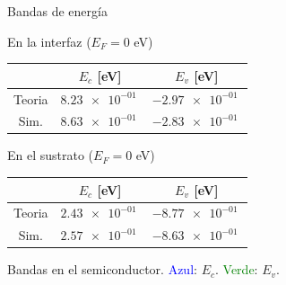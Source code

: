 \documentclass{/home/daniel/GitHub/USC-Physics-Degree-Notes/Notes/Presentacion}
\begin{document}
\begin{frame}{Bandas de energía}
    \begin{minipage}{0.4\linewidth}
        \begin{center}
            \small
            En la interfaz ($E_F=0$ eV)
            \vspace*{1em}

            \begin{tabular}{ccc}
                \toprule
                & $E_c $ [eV] & $E_v $ [eV]  \\ \midrule
                Teoria &  $\SI{8.23e-01}{}$& $\SI{-2.97e-01}{}$\\
                Sim. &  $\SI{8.63e-01}{}$& $\SI{-2.83e-01}{}$  \\
                \bottomrule
            \end{tabular}

            \vspace*{2em}

            En el sustrato ($E_F=0$ eV) 

            \vspace*{1em}

            \begin{tabular}{ccc}
                \toprule
                & $E_c $ [eV] & $E_v $ [eV]  \\ \midrule
                Teoria & $\SI{2.43e-01}{}$ & $\SI{-8.77e-01}{}$ \\
                Sim. & $\SI{2.57e-01}{}$ & $\SI{-8.63e-01}{}$ \\
                \bottomrule
            \end{tabular}
        \end{center}
    \end{minipage}
    \hfill
    \begin{minipage}{0.55\linewidth}\centering

        Bandas en el semiconductor. \textcolor{blue}{Azul}: $E_c$. \textcolor{Green}{Verde}: $E_v$.  

        \vspace*{1em}
        

\end{minipage}
\end{frame}
\end{document}
